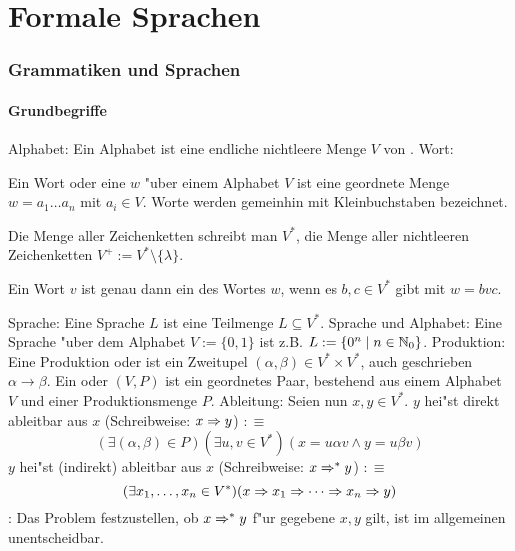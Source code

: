 \def\To{ERROR}
\part{Formale Sprachen}
\section{Grammatiken und Sprachen}
\subsection{Grundbegriffe}
 Alphabet:{
  Ein Alphabet ist eine endliche nichtleere Menge $V$ von .
  }
 Wort:{
  Ein Wort oder eine  $w$ "uber einem Alphabet $V$ ist 
  eine geordnete Menge $w=a_1\ldots a_n$ mit $a_i\in V$. Worte werden
  gemeinhin mit Kleinbuchstaben bezeichnet.
  
  Die Menge aller Zeichenketten schreibt man $V^*$, die Menge aller nichtleeren
  Zeichenketten $V^+:=V^*\setminus \{\lambda\}$.

  Ein Wort $v$ ist genau dann ein  des Wortes $w$, wenn 
  es $b,c\in V^*$ gibt mit $w = bvc$.
  }
 Sprache:{
  Eine Sprache $L$ ist eine Teilmenge $L\subseteq V^*$.
  }
\example Sprache und Alphabet:{
  Eine Sprache "uber dem Alphabet $V := \{0,1\}$ ist z.B. 
  $L:=\{0^n\mid n\in\mathbb N_0\}$.
  }
 Produktion:{
  Eine Produktion oder  ist ein Zweitupel
  $(\alpha, \beta) \in V^* \times V^*$, auch geschrieben $\alpha \to \beta$. 
  Ein  oder  $(V,P)$ 
  ist ein geordnetes Paar, bestehend aus einem Alphabet $V$ und einer 
  Produktionsmenge $P$.
  }
 Ableitung:{
  Seien nun $x, y \in V^*$. $y$ hei"st direkt ableitbar aus $x$ 
  (Schreibweise: $x\Rightarrow y$) $:\equiv$
  \[(\exists (\alpha, \beta) \in P)(\exists u, v \in V^*)(x = u \alpha
    v \land y = u \beta v)
    \]
  $y$ hei"st (indirekt) ableitbar aus $x$ (Schreibweise: $x\Rightarrow^* y$) 
  $:\equiv$ 
  \[(\exists x_1,\ldots,x_n\in V^*)(x\Rightarrow x_1 \Rightarrow \cdots 
    \Rightarrow x_n \Rightarrow y)
    \]
  }
\remark:{
  Das Problem festzustellen, ob $x \Rightarrow^* y$ f"ur gegebene $x,y$ gilt, 
  ist im allgemeinen unentscheidbar.
  }
